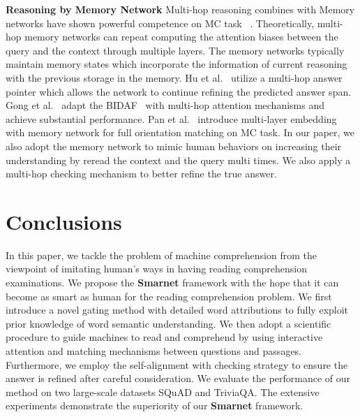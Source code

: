 \documentclass[letterpaper]{article} \usepackage{aaai18}  \usepackage{times}  \usepackage{helvet}  \usepackage{courier}  \usepackage{url}  \usepackage{graphicx}  \usepackage{booktabs}
\begin{document}
 \noindent \textbf{Reasoning by Memory Network} Multi-hop reasoning combines with Memory networks have shown powerful competence on MC task~\cite{shen2017reasonet} \cite{Dhingra2017Gated} \cite{Sordoni2016Iterative} \cite{xiong2016dynamic} \cite{Hu2017Mnemonic} \cite{Gong2017Ruminating} \cite{Kumar2016AskMA}. Theoretically, multi-hop memory networks can repeat computing the attention biases between the query and the context through multiple layers. The memory networks typically maintain memory states which incorporate the information of current reasoning with the previous storage in the memory. Hu et al.~\cite{Hu2017Mnemonic} utilize a multi-hop answer pointer which allows the network to continue refining the predicted answer span. Gong et al.~\cite{Gong2017Ruminating} adapt the BIDAF~\cite{seo2016bidirectional} with multi-hop attention mechanisms and achieve substantial performance. Pan et al.~\cite{Pan2017MEMEN} introduce multi-layer embedding with memory network for full orientation matching on MC task. In our paper, we also adopt the memory network to mimic human behaviors on increasing their understanding by reread the context and the query multi times. We also apply a multi-hop checking mechanism to better refine the true answer.

\section{Conclusions}
In this paper, we tackle the problem of machine comprehension from the viewpoint of imitating human's ways in having reading comprehension examinations. We propose the \textbf{Smarnet} framework with the hope that it can become as smart as human for the reading comprehension problem. We first introduce a novel gating method with detailed word attributions to fully exploit prior knowledge of word semantic understanding. We then adopt a scientific procedure to guide machines to read and comprehend by using interactive attention and matching mechanisms between questions and passages. Furthermore, we employ the self-alignment with checking strategy to ensure the answer is refined after careful consideration. We evaluate the performance of our method on two large-scale datasets SQuAD and TriviaQA. The extensive experiments demonstrate the superiority of our \textbf{Smarnet} framework. 


\end{document}
